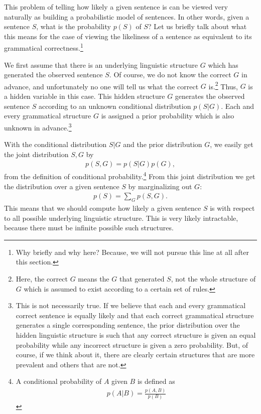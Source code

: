 \documentclass{report}
\begin{document}
This problem of telling how likely a given sentence is can be viewed very
naturally as building a probabilistic model of sentences. In other words, given
a sentence $S$, what is the probability $p(S)$ of $S$?  Let us briefly talk
about what this means for the case of viewing the likeliness of a sentence as
equivalent to its grammatical correctness.\footnote{
    Why briefly and why here? Because, we will not pursue this line at all after
    this section.
}

We first assume that there is an underlying linguistic structure $G$ which has
generated the observed sentence $S$. Of course, we do not know the correct $G$
in advance, and unfortunately no one will tell us what the correct $G$
is.\footnote{
    Here, the correct $G$ means the $G$ that generated $S$, not the whole
    structure of $G$ which is assumed to exist according to a certain set of
    rules.
}
Thus,
$G$ is a hidden variable in this case. This hidden structure $G$ generates the
observed sentence $S$ according to an unknown conditional distribution $p(S|G)$.
Each and every grammatical structure $G$ is assigned a prior probability which
is also unknown in advance.\footnote{
    This is not necessarily true. If we believe that each and every grammatical
    correct sentence is equally likely and that each correct grammatical
    structure generates a single corresponding sentence, the prior distribution
    over the hidden linguistic structure is such that any correct structure is
    given an equal probability while any incorrect structure is given a zero
    probability. But, of course, if we think about it, there are clearly certain
    structures that are more prevalent and others that are not.
}

With the conditional distribution $S|G$ and the prior distribution $G$, we
easily get the joint distribution $S,G$ by
\begin{align*}
    p(S,G) = p(S|G) p(G),
\end{align*}
from the definition of conditional probability.\footnote{
    A conditional probability of $A$ given $B$ is defined as
    \begin{align*}
        p(A|B) = \frac{p(A, B)}{p(B)}
    \end{align*}
} 
From this joint distribution we get the distribution over a given sentence $S$
by marginalizing out $G$:
\begin{align*}
    p(S) = \sum_{G} p(S, G).
\end{align*}
This means that we should compute how likely a given sentence $S$ is with
respect to all possible underlying linguistic structure. This is very likely
intractable, because there must be infinite possible such structures.
\end{document}
